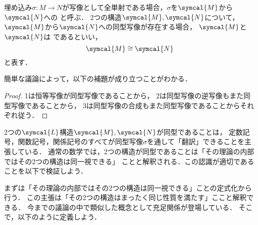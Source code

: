 \begin{Def}
	埋め込み\(\sigma \colon M \to N\)が写像として全単射である場合，\(\sigma\)を\(\symcal{M}\)から\(\symcal{N}\)への
	と呼ぶ．
	2つの構造\(\symcal{M}, \symcal{N}\)について，\(\symcal{M}\)から\(\symcal{N}\)への同型写像が存在する場合，
	\(\symcal{M}\)と\(\symcal{N}\)は%
	であるといい，%
	\begin{equation}
		\symcal{M} \isomorphic \symcal{N}
		\label{eq:isomorphic}
	\end{equation}
	と表す．
\end{Def}

簡単な議論によって，以下の補題が成り立つことがわかる．


\begin{proof}
	1は恒等写像が同型写像であることから，
	2は同型写像の逆写像もまた同型写像であることから，
	3は同型写像の合成もまた同型写像であることからそれぞれ従う．
\end{proof}

2つの\(\symcal{L}\)構造\(\symcal{M}, \symcal{N}\)が同型であることは，
定数記号，関数記号，関係記号のすべてが同型写像\(\sigma\)を通して「翻訳」できることを主張している．
通常の数学では，2つの構造が同型であることは「その理論の内部ではその2つの構造は同一視できる」
ことと解釈される．この認識が適切であることを以下で検証しよう．

まずは「その理論の内部ではその2つの構造は同一視できる」ことの定式化から行う．
この主張は「その2つの構造はまったく同じ性質を満たす」ここと解釈できる．
今までの議論の中で類似した概念として充足関係が登場している．
そこで，以下のように定義しよう．

